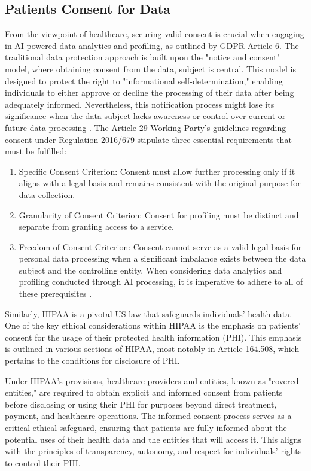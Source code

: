 \documentclass{article}
\begin{document}
\subsection{Patients Consent for Data }

From the viewpoint of healthcare, securing valid consent is crucial when engaging in AI-powered data analytics and profiling, as outlined by GDPR Article 6. The traditional data protection approach is built upon the "notice and consent" model, where obtaining consent from the data, subject is central. This model is designed to protect the right to "informational self-determination," enabling individuals to either approve or decline the processing of their data after being adequately informed. Nevertheless, this notification process might lose its significance when the data subject lacks awareness or control over current or future data processing \cite{9400809}. The Article 29 Working Party's guidelines regarding consent under Regulation 2016/679 stipulate three essential requirements that must be fulfilled:
\begin{enumerate}
    \item Specific Consent Criterion: Consent must allow further processing only if it aligns with a legal basis and remains consistent with the original purpose for data collection.
    \item Granularity of Consent Criterion: Consent for profiling must be distinct and separate from granting access to a service.
    \item Freedom of Consent Criterion: Consent cannot serve as a valid legal basis for personal data processing when a significant imbalance exists between the data subject and the controlling entity.
When considering data analytics and profiling conducted through AI processing, it is imperative to adhere to all of these prerequisites \cite{party2016guidelines}.
\end{enumerate}

Similarly, HIPAA is a pivotal US law that safeguards individuals' health data. One of the key ethical considerations within HIPAA is the emphasis on patients' consent for the usage of their protected health information (PHI). This emphasis is outlined in various sections of HIPAA, most notably in Article 164.508, which pertains to the conditions for disclosure of PHI.

Under HIPAA's provisions, healthcare providers and entities, known as "covered entities," are required to obtain explicit and informed consent from patients before disclosing or using their PHI for purposes beyond direct treatment, payment, and healthcare operations. The informed consent process serves as a critical ethical safeguard, ensuring that patients are fully informed about the potential uses of their health data and the entities that will access it. This aligns with the principles of transparency, autonomy, and respect for individuals' rights to control their PHI.
\end{document}
